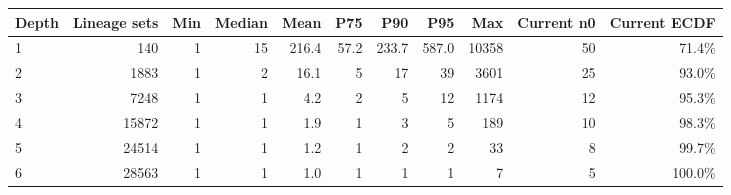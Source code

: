\begin{tabular}{lrrrrrrrrrr}
\toprule
Depth & Lineage sets & Min & Median & Mean & P75 & P90 & P95 & Max & Current n0 & Current ECDF
 \\
\midrule
1 & 140 & 1 & 15 & 216.4 & 57.2 & 233.7 & 587.0 & 10358 & 50 & 71.4\%
 \\
2 & 1883 & 1 & 2 & 16.1 & 5 & 17 & 39 & 3601 & 25 & 93.0\%
 \\
3 & 7248 & 1 & 1 & 4.2 & 2 & 5 & 12 & 1174 & 12 & 95.3\%
 \\
4 & 15872 & 1 & 1 & 1.9 & 1 & 3 & 5 & 189 & 10 & 98.3\%
 \\
5 & 24514 & 1 & 1 & 1.2 & 1 & 2 & 2 & 33 & 8 & 99.7\%
 \\
6 & 28563 & 1 & 1 & 1.0 & 1 & 1 & 1 & 7 & 5 & 100.0\%
 \\
\bottomrule
\end{tabular}
